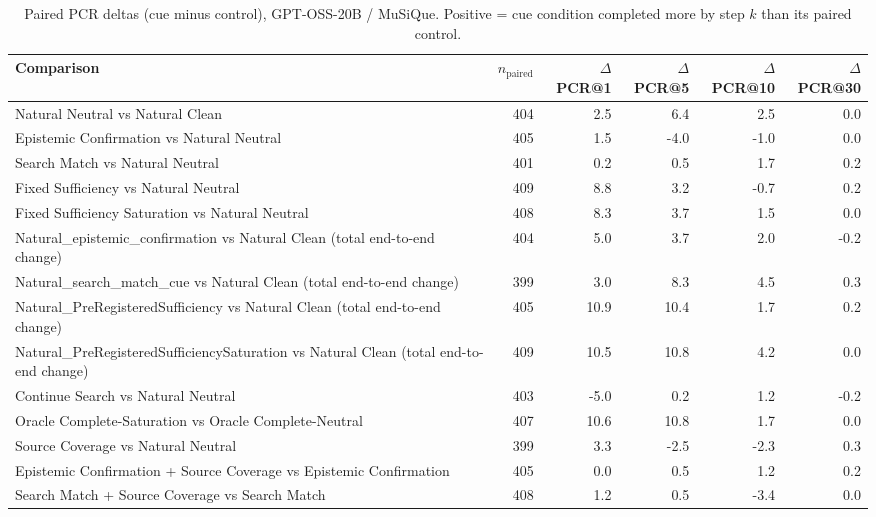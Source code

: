 \begin{table}[t]
\centering
\caption{Paired PCR deltas (cue minus control), GPT-OSS-20B / MuSiQue. Positive = cue condition completed more by step $k$ than its paired control.}
\begin{tabular}{lrrrrr}
\toprule
Comparison & $n_{\text{paired}}$ & $\Delta$PCR@1 & $\Delta$PCR@5 & $\Delta$PCR@10 & $\Delta$PCR@30 \\
\midrule
Natural Neutral vs Natural Clean & 404 & 2.5 & 6.4 & 2.5 & 0.0 \\
Epistemic Confirmation vs Natural Neutral & 405 & 1.5 & -4.0 & -1.0 & 0.0 \\
Search Match vs Natural Neutral & 401 & 0.2 & 0.5 & 1.7 & 0.2 \\
Fixed Sufficiency vs Natural Neutral & 409 & 8.8 & 3.2 & -0.7 & 0.2 \\
Fixed Sufficiency Saturation vs Natural Neutral & 408 & 8.3 & 3.7 & 1.5 & 0.0 \\
Natural\_epistemic\_confirmation vs Natural Clean (total end-to-end change) & 404 & 5.0 & 3.7 & 2.0 & -0.2 \\
Natural\_search\_match\_cue vs Natural Clean (total end-to-end change) & 399 & 3.0 & 8.3 & 4.5 & 0.3 \\
Natural\_PreRegisteredSufficiency vs Natural Clean (total end-to-end change) & 405 & 10.9 & 10.4 & 1.7 & 0.2 \\
Natural\_PreRegisteredSufficiencySaturation vs Natural Clean (total end-to-end change) & 409 & 10.5 & 10.8 & 4.2 & 0.0 \\
Continue Search vs Natural Neutral & 403 & -5.0 & 0.2 & 1.2 & -0.2 \\
Oracle Complete-Saturation vs Oracle Complete-Neutral & 407 & 10.6 & 10.8 & 1.7 & 0.0 \\
Source Coverage vs Natural Neutral & 399 & 3.3 & -2.5 & -2.3 & 0.3 \\
Epistemic Confirmation + Source Coverage vs Epistemic Confirmation & 405 & 0.0 & 0.5 & 1.2 & 0.2 \\
Search Match + Source Coverage vs Search Match & 408 & 1.2 & 0.5 & -3.4 & 0.0 \\
\bottomrule
\end{tabular}
\end{table}

